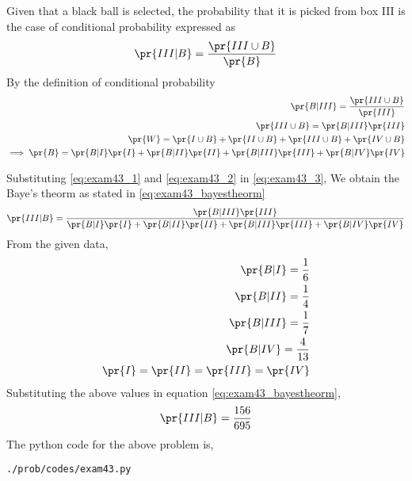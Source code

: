 Given that a black ball is selected, the probability that it is picked from box III is the case of conditional probability expressed as
\begin{align}
\pr{III|B}=\frac{\pr{III \cup B}}{\pr{B}}
\label{eq:exam43_3}
\end{align}
By the definition of conditional probability
\begin{align}
\pr{B|III}=\frac{\pr{III \cup B}}{\pr{III}}
\\
\pr{III \cup B} = \pr{B|III}\pr{III}
\label{eq:exam43_1}
\\
\pr{W}=\pr{I \cup B}+\pr{II \cup B}+\pr{III \cup B}+\pr{IV \cup B}
\\
\implies \pr{B} = \pr{B|I} \pr{I}+\pr{B|II} \pr{II}+\pr{B|III} \pr{III}+\pr{B|IV} \pr{IV}
\label{eq:exam43_2}
\end{align}

Substituting \eqref{eq:exam43_1} and \eqref{eq:exam43_2} in \eqref{eq:exam43_3}, We obtain the Baye's theorm as stated in \eqref{eq:exam43_bayestheorm}
\begin{align}
\pr{III|B}= \frac{\pr{B|III} \pr{III}}{\pr{B|I} \pr{I}+\pr{B|II} \pr{II}+\pr{B|III} \pr{III}+\pr{B|IV} \pr{IV}}
\label{eq:exam43_bayestheorm}
\end{align}
From the given data,
\begin{align}
\pr{B|I} = \frac{1}{6}
\\
\pr{B|II} = \frac{1}{4}
\\
\pr{B|III} = \frac{1}{7}
\\
\pr{B|IV} = \frac{4}{13}
\\
\pr{I}=\pr{II}=\pr{III}=\pr{IV}
\end{align}
Substituting the above values in equation \eqref{eq:exam43_bayestheorm},
\begin{align}
\pr{III|B}=\frac{156}{695}
\end{align}
The python code for the above problem is,
\begin{lstlisting}
./prob/codes/exam43.py
\end{lstlisting}
